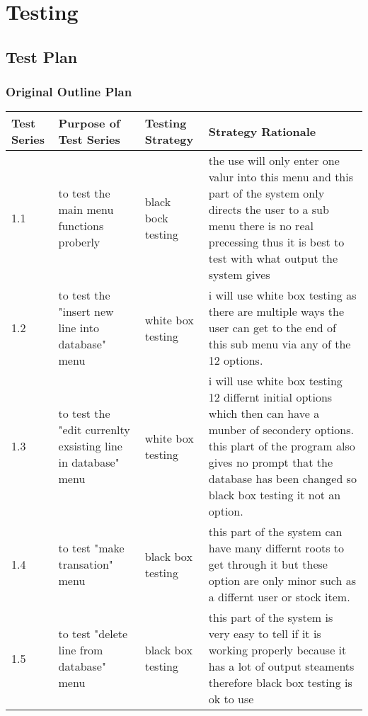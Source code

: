 \chapter{Testing}

\section{Test Plan}

\begin{landscape}
\subsection{Original Outline Plan}

\begin{center}
    \begin{tabular}{|p{2cm}|p{5cm}|p{5cm}|p{4cm}|}
        \hline
        \textbf{Test Series} & \textbf{Purpose of Test Series} & \textbf{Testing Strategy} & \textbf{Strategy Rationale}\\  \hline
        1.1 & to test the main menu functions proberly  & black bock testing & the use will only enter one valur into this menu and this part of the system only directs the user to a sub menu there is no real precessing thus it is best to test with what output the system gives \\ \hline
1.2 &to test the "insert new line into database" menu & white box testing & i will use white box testing as there are multiple ways the user can get to the end of this sub menu via any of the 12 options.\\ \hline
1.3 & to test the "edit currenlty exsisting line in database" menu & white box testing & i will use white box testing 12 differnt initial options which then can have a munber of secondery options. this plart of the program also gives no prompt that the database has been changed so black box testing it not an option. \\ \hline
1.4 & to test "make transation" menu & black box testing & this part of the system can have many differnt roots to get through it but these option are only minor such as a differnt user or stock item. \\ \hline
1.5 & to test "delete line from database" menu & black box testing & this part of the system is very easy to tell if it is working properly because it has a lot of output steaments therefore black box testing is ok to use \\ \hline
    \end{tabular}
\end{center}


\end{landscape}
